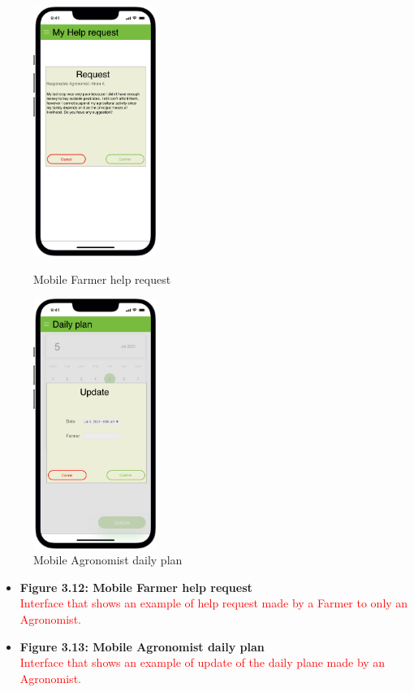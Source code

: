 \begin{figure}[H]
  \centering
   \begin{minipage}{0.4\textwidth}
     \includegraphics[width=40mm,scale=0.9]{./Images//Mocks/Mobile/Farmer_help_req.png}
     \caption{Mobile Farmer help request}
   \end{minipage}
    \hfill
   \begin{minipage}{0.4\textwidth}
     \includegraphics[width=40mm,scale=0.9]{./Images//Mocks/Mobile/Agronomist_daily_plan.png}
     \caption{Mobile Agronomist daily plan}
   \end{minipage}
\end{figure}

\begin{itemize}
    \item \textbf{Figure 3.12: Mobile Farmer help request}\\ 
    \textcolor{red}{Interface that shows an example of help request made by a Farmer to only an Agronomist.}
\end{itemize}
\begin{itemize}
    \item \textbf{Figure 3.13: Mobile Agronomist daily plan}\\ 
    \textcolor{red}{Interface that shows an example of update of the daily plane made by an Agronomist.}
\end{itemize}
\newpage
